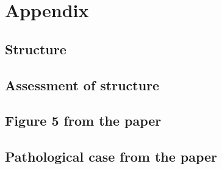 \section{Appendix}

\subsection{Structure}

\subsection{Assessment of structure}



\subsection{Figure 5 from the paper}


\subsection{Pathological case from the paper}



